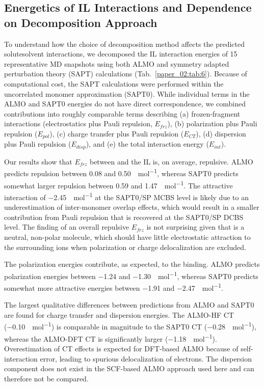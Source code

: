 \subsection{Energetics of \textendash{}IL Interactions and Dependence on Decomposition Approach}
\label{paper_02:sssec:IIIC2}

To understand how the choice of decomposition method affects the predicted solute\textendash{}solvent interactions, we decomposed the \textendash{}IL interaction energies of \num{15} representative MD snapshots using both ALMO and symmetry adapted perturbation theory (SAPT) calculations (Tab.~\ref{paper_02:tab:6}). Because of computational cost, the SAPT calculations were performed within the uncorrelated monomer approximation (SAPT0). While individual terms in the ALMO and SAPT0 energies do not have direct correspondence, we combined contributions into roughly comparable terms describing (a) frozen-fragment interactions (electrostatics plus Pauli repulsion, \(E_{frz}\)), (b) polarization plus Pauli repulsion (\(E_{pol}\)), (c) charge transfer plus Pauli repulsion (\(E_{CT}\)), (d) dispersion plus Pauli repulsion (\(E_{disp}\)), and (e) the total interaction energy (\(E_{int}\)).

Our results show that \(E_{frz}\) between  and the IL is, on average, repulsive. ALMO predicts repulsion between \num{+0.08} and \SI{0.50}{\kcal\per\mole}, whereas SAPT0 predicts somewhat larger repulsion between \num{0.59} and \SI{1.47}{\kcal\per\mole}. The attractive interaction of \SI{-2.45}{\kcal\per\mole} at the SAPT0/SP MCBS level is likely due to an underestimation of inter-monomer overlap effects, which would result in a smaller contribution from Pauli repulsion that is recovered at the SAPT0/SP DCBS level. The finding of an overall repulsive \(E_{frz}\) is not surprising given that  is a neutral, non-polar molecule, which should have little electrostatic attraction to the surrounding ions when polarization or charge delocalization are excluded.

The polarization energies contribute, as expected, to the binding. ALMO predicts polarization energies between \num{-1.24} and \SI{-1.30}{\kcal\per\mole}, whereas SAPT0 predicts somewhat more attractive energies between \num{-1.91} and \SI{-2.47}{\kcal\per\mole}.

The largest qualitative differences between predictions from ALMO and SAPT0 are found for charge transfer and dispersion energies. The ALMO-HF CT (\SI{-0.10}{\kcal\per\mole}) is comparable in magnitude to the SAPT0 CT (\SI{-0.28}{\kcal\per\mole}), whereas the ALMO-DFT CT is significantly larger (\SI{-1.18}{\kcal\per\mole}). Overestimation of CT effects is expected for DFT-based ALMO because of self-interaction error, leading to spurious delocalization of electrons. The dispersion component does not exist in the SCF-based ALMO approach used here and can therefore not be compared.

